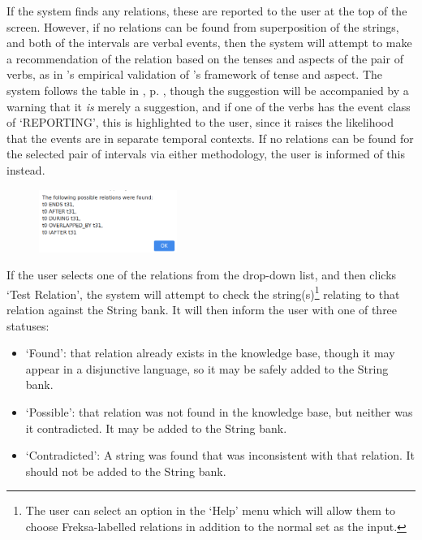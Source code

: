 \documentclass[a4paper,12pt,leqno,twoside]{article}
\begin{document}
If the system finds any relations, these are reported to the user at the top of the screen. However, if no relations can be found from superposition of the strings, and both of the intervals are verbal events, then the system will attempt to make a recommendation of the relation based on the tenses and aspects of the pair of verbs, as in \citet{Derczynski2013}'s empirical validation of \citet{reichenbach1947elements}'s framework of tense and aspect. The system follows the table in , p. \pageref{fig:tense-aspect-freksa}, though the suggestion will be accompanied by a warning that it \textit{is} merely a suggestion, and if one of the verbs has the event class of `REPORTING', this is highlighted to the user, since it raises the likelihood that the events are in separate temporal contexts.  If no relations can be found for the selected pair of intervals via either methodology, the user is informed of this instead.
\begin{center}
	\begin{figure}[h!]
		\centering
		\includegraphics[width=0.4\textwidth]{images/START-try-2.png}
	\end{figure}
\end{center}
If the user selects one of the relations from the drop-down list, and then clicks `Test Relation', the system will attempt to check the string(s)\footnote{The user can select an option in the `Help' menu which will allow them to choose Freksa-labelled relations in addition to the normal set as the input.} relating to that relation against the String bank. It will then inform the user with one of three statuses:
\begin{itemize}
	\item `Found': that relation already exists in the knowledge base, though it may appear in a disjunctive language, so it may be safely added to the String bank.
	\item `Possible': that relation was not found in the knowledge base, but neither was it contradicted. It may be added to the String bank.
	\item `Contradicted': A string was found that was inconsistent with that relation. It should not be added to the String bank.
\end{itemize}
\end{document}
